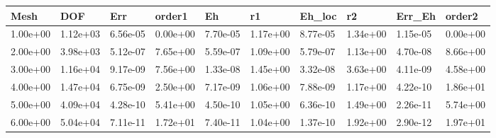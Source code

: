 \begin{tabular}{llllllllll}
Mesh & DOF & Err & order1 & Eh & r1 & Eh_loc & r2 & Err_Eh & order2 \\ 
\hline 
1.00e+00 & 1.12e+03 & 6.56e-05 & 0.00e+00 & 7.70e-05 & 1.17e+00 & 8.77e-05 & 1.34e+00 & 1.15e-05 & 0.00e+00 \\ 
2.00e+00 & 3.98e+03 & 5.12e-07 & 7.65e+00 & 5.59e-07 & 1.09e+00 & 5.79e-07 & 1.13e+00 & 4.70e-08 & 8.66e+00 \\ 
3.00e+00 & 1.16e+04 & 9.17e-09 & 7.56e+00 & 1.33e-08 & 1.45e+00 & 3.32e-08 & 3.63e+00 & 4.11e-09 & 4.58e+00 \\ 
4.00e+00 & 1.47e+04 & 6.75e-09 & 2.50e+00 & 7.17e-09 & 1.06e+00 & 7.88e-09 & 1.17e+00 & 4.22e-10 & 1.86e+01 \\ 
5.00e+00 & 4.09e+04 & 4.28e-10 & 5.41e+00 & 4.50e-10 & 1.05e+00 & 6.36e-10 & 1.49e+00 & 2.26e-11 & 5.74e+00 \\ 
6.00e+00 & 5.04e+04 & 7.11e-11 & 1.72e+01 & 7.40e-11 & 1.04e+00 & 1.37e-10 & 1.92e+00 & 2.90e-12 & 1.97e+01 \\ 
\hline 
\end{tabular}